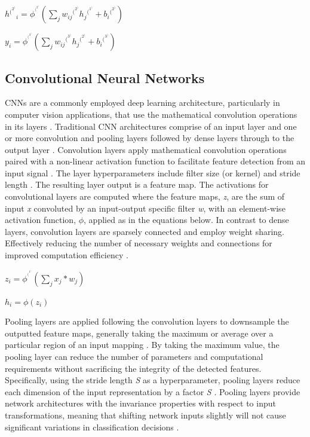 \documentclass{article}
\begin{document}
\centerline{$h{^(^2^)}_{i} = \phi^{^(^2^)}(\sum_{j} w_{ij}{^(^2^)}h_j{^(^1^)} + b_i{^(^2^)})$}

\centerline{$y_{i} = \phi^{^(^3^)}(\sum_{j} w_{ij}{^(^3^)}h_j{^(^2^)} + b_i{^(^3^)})$ \cite{grosse2019lecture03}}




\subsection{Convolutional Neural Networks}
CNNs are a commonly employed deep learning architecture, particularly in computer vision applications, that use the mathematical convolution operations in its layers \cite{grosse2019lecture09}. Traditional CNN architectures comprise of an input layer and one or more convolution and pooling layers followed by dense layers through to the output layer \cite{amidi_amidi}. Convolution layers apply mathematical convolution operations paired with a non-linear activation function to facilitate feature detection from an input signal \cite{grosse2019lecture09}. The layer hyperparameters include filter size (or kernel) and stride length \cite{amidi_amidi}. The resulting layer output is a feature map.  The activations for convolutional layers are computed where the feature maps, \emph{z}, are the sum of input \emph{x} convoluted by an input-output specific filter \emph{w}, with an element-wise activation function, $\phi$, applied as in the equations below. In contrast to dense layers, convolution layers are sparsely connected and employ weight sharing. Effectively reducing the number of necessary weights and connections for improved computation efficiency \cite{grosse2019lecture09}.
\newline
\newline
\centerline{$z_{i} = \phi^{^(^1^)}(\sum_{j} x_{j}*w_j)$}
\centerline{$h_i = \phi(z_i)$ \cite{grosse2019lecture09}}
\newline

Pooling layers are applied following the convolution layers to downsample the outputted feature maps, generally taking the maximum or average over a particular region of an input mapping \cite{grosse2019lecture09,amidi_amidi}. By taking the maximum value, the pooling layer can reduce the number of parameters and computational requirements without sacrificing the integrity of the detected features. Specifically, using the stride length \emph{S} as a hyperparameter, pooling layers reduce each dimension of the input representation by a factor \emph{S} \cite{grosse2019lecture09}. Pooling layers provide network architectures with the invariance properties with respect to input transformations, meaning that shifting network inputs slightly will not cause significant variations in classification decisions \cite{grosse2019lecture09}. 
\end{document}

